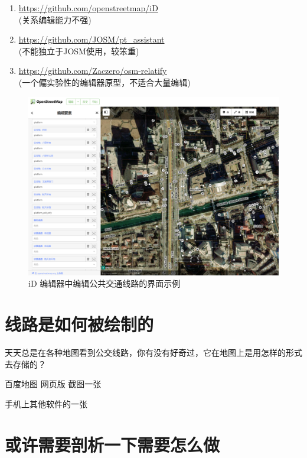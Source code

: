 \documentclass{beamer}
\begin{document}
\begin{frame}
    \begin{enumerate}
        \item \url{https://github.com/openstreetmap/iD} \\
        (关系编辑能力不强)
        \item \url{https://github.com/JOSM/pt_assistant} \\
        (不能独立于JOSM使用，较笨重)
        \item \url{https://github.com/Zaczero/osm-relatify} \\
        (一个偏实验性的编辑器原型，不适合大量编辑)
    \end{enumerate}
    \begin{figure}[htpb]
        \centering
        \includegraphics[width=0.2\linewidth]{figure/editor-iD.png}
        \caption{iD 编辑器中编辑公共交通线路的界面示例}
    \end{figure}
\end{frame}

\section{线路是如何被绘制的}

\begin{frame}
    \Large
    天天总是在各种地图看到公交线路，你有没有好奇过，它在地图上是用怎样的形式去存储的？
\end{frame}

\begin{frame}

    百度地图 网页版 截图一张

    手机上其他软件的一张
\end{frame}




\section{或许需要剖析一下需要怎么做}
\end{document}
